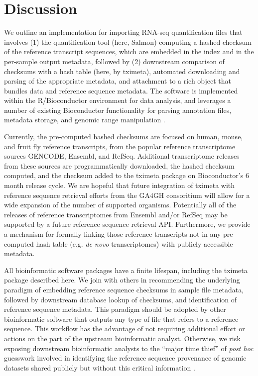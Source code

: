 \documentclass[12pt]{article} \usepackage[utf8]{inputenc}
\begin{document}
\section*{Discussion}

We outline an implementation for importing RNA-seq quantification
files that involves (1) the quantification tool (here, Salmon)
computing a hashed checksum of the reference transcript sequences,
which are embedded in the index and in the per-sample output metadata,
followed by (2) downstream comparison of checksums with a hash table
(here, by tximeta), automated downloading and parsing of the
appropriate metadata, and attachment to a rich object that bundles
data and reference sequence metadata. The software is implemented
within the R/Bioconductor environment for data analysis, and leverages
a number of existing Bioconductor functionality for parsing annotation
files, metadata storage, and genomic range manipulation
\citep{bioc,ensembldb,biocfilecache,granges}.

Currently, the pre-computed hashed checksums are focused on human,
mouse, and fruit fly reference transcripts, from the popular reference
transcriptome sources GENCODE, Ensembl, and RefSeq. Additional
transcriptome releases from these sources are programmatically
downloaded, the hashed checksum computed, and the checksum added to
the tximeta package on Bioconductor's 6 month release cycle. We are
hopeful that future integration of tximeta with reference sequence
retrieval efforts from the GA4GH consoritium will allow for a wide
expansion of the number of supported organisms. Potentially all of the
releases of reference transcriptomes from Ensembl and/or RefSeq may be
supported by a future reference sequence retrieval API. Furthermore,
we provide a mechanism for formally linking those reference
transcripts not in any pre-computed hash table (e.g. \textit{de novo}
transcriptomes) with publicly accessible metadata.


All bioinformatic software packages have a finite lifespan, including
the tximeta package described here. We join with others in
recommending the underlying paradigm of embedding reference sequence
checksums in sample file metadata, followed by downstream database
lookup of checksums, and identification of reference sequence
metadata. This paradigm should be adopted by other bioinformatic
software that outputs any type of file that refers to a reference
sequence. This workflow has the advantage of not requiring additional
effort or actions on the part of the upstream bioinformatic
analyst. Otherwise, we risk exposing downstream bioinformatic analysts
to the ``major time thief'' of \textit{post hoc} guesswork involved in
identifying the reference sequence provenance of genomic datasets
shared publicly but without this critical information
\citep{Kanduri2017}.
\end{document}
